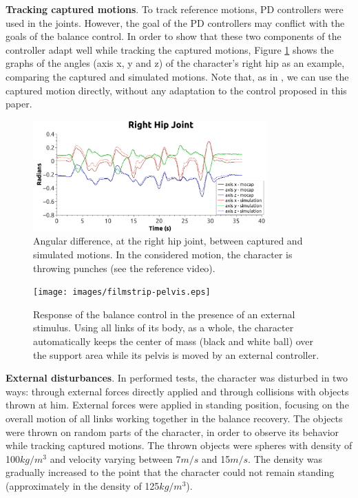 \documentclass[tog]{acmsiggraph}
\begin{document}
\noindent \textbf{Tracking captured motions}. To track reference motions, PD controllers were used in the joints. However, the goal of the PD
controllers may conflict with the goals of the balance control. In order to show that these two components of the controller adapt well while
tracking the captured motions, Figure \ref{fig:grafico-quadril-direito} shows the graphs of the angles (axis x, y and z) of the character's right hip as an example, comparing 
the captured and simulated motions. Note that, as in \cite{bib:Geijtenbeek12}, we can use the captured motion directly, without any adaptation to the control 
proposed in this paper.

%

\begin{figure}[thbp]
\centering
\includegraphics[width=9cm]{images/ombro-direito-translate.png}
\caption{Angular difference, at the right hip joint, between captured and simulated motions.
In the considered motion, the character is throwing punches (see the reference video).}
\label{fig:grafico-quadril-direito}
\end{figure}


\begin{figure}[!tbh]
     \centering
     \texttt{[image: images/filmstrip-pelvis.eps]} %
     \caption{Response of the balance control in the presence of an external stimulus.
              Using all links of its body, as a whole, the character automatically keeps the center of mass (black and white ball)
              over the support area while its pelvis is moved by an external controller.}
     \label{fig:controle-externo}
     \centering
\end{figure}

\noindent \textbf{External disturbances}. In performed tests, the character was disturbed in two ways: through external forces directly applied
and through collisions with objects thrown at him. External forces were applied in standing position, focusing on the overall motion of all links
working together in the balance recovery. The objects were thrown on random parts of the character, in order to observe its behavior while
tracking captured motions. The thrown objects were spheres with density of 100$kg/m^{3}$ and velocity varying between 7$m/s$ and 15$m/s$. The density was gradually increased to the point that the character could not remain standing (approximately in the density of 125$kg/m^{3}$).
\end{document}
